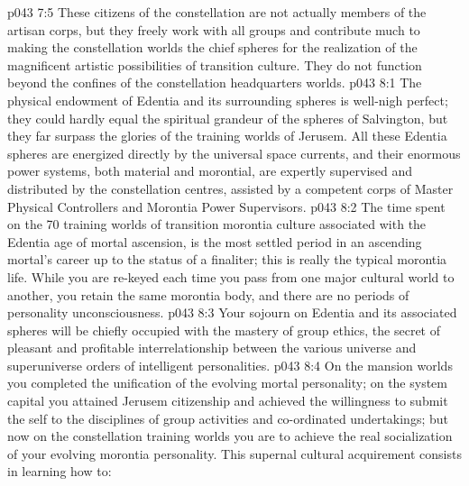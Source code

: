 \vs p043 7:5 These citizens of the constellation are not actually members of the artisan corps, but they freely work with all groups and contribute much to making the constellation worlds the chief spheres for the realization of the magnificent artistic possibilities of transition culture. They do not function beyond the confines of the constellation headquarters worlds.
\vs p043 8:1 The physical endowment of Edentia and its surrounding spheres is well\hyp{}nigh perfect; they could hardly equal the spiritual grandeur of the spheres of Salvington, but they far surpass the glories of the training worlds of Jerusem. All these Edentia spheres are energized directly by the universal space currents, and their enormous power systems, both material and morontial, are expertly supervised and distributed by the constellation centres, assisted by a competent corps of Master Physical Controllers and Morontia Power Supervisors.
\vs p043 8:2 The time spent on the 70 training worlds of transition morontia culture associated with the Edentia age of mortal ascension, is the most settled period in an ascending mortal’s career up to the status of a finaliter; this is really the typical morontia life. While you are re\hyp{}keyed each time you pass from one major cultural world to another, you retain the same morontia body, and there are no periods of personality unconsciousness.
\vs p043 8:3 Your sojourn on Edentia and its associated spheres will be chiefly occupied with the mastery of group ethics, the secret of pleasant and profitable interrelationship between the various universe and superuniverse orders of intelligent personalities.
\vs p043 8:4 On the mansion worlds you completed the unification of the evolving mortal personality; on the system capital you attained Jerusem citizenship and achieved the willingness to submit the self to the disciplines of group activities and co\hyp{}ordinated undertakings; but now on the constellation training worlds you are to achieve the real socialization of your evolving morontia personality. This supernal cultural acquirement consists in learning how to:
